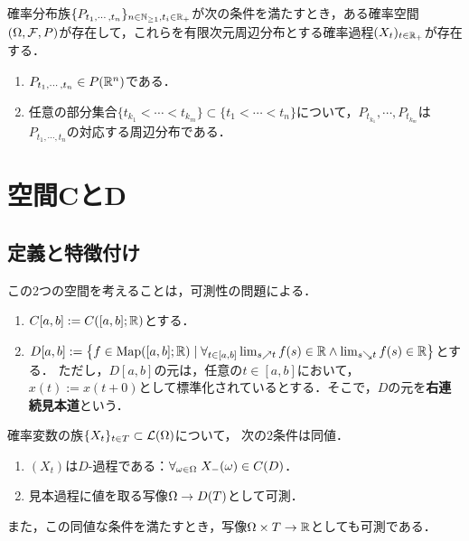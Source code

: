 \documentclass[uplatex,dvipdfmx]{jsreport}
\begin{document}
\begin{theorem}[確率過程版]\label{thm-Kolmogorov-extension-theorem}
    確率分布族$\{P_{t_1,\cdots,t_n}\}_{n\in\mathbb{N}_{\ge1},t_i\in\mathbb{R}_+}$が次の条件を満たすとき，ある確率空間$(\Omega,\mathcal{F},P)$が存在して，これらを有限次元周辺分布とする確率過程$(X_t)_{t\in\mathbb{R}_+}$が存在する．
    \begin{enumerate}[({C}1)]
        \item $P_{t_1,\cdots,t_n}\in P(\mathbb{R}^n)$である．
        \item 任意の部分集合$\{t_{k_1}<\cdots<t_{k_m}\}\subset\{t_1<\cdots<t_n\}$について，$P_{t_{k_1}},\cdots,P_{t_{k_m}}$は$P_{t_1,\cdots,t_n}$の対応する周辺分布である．
    \end{enumerate}
\end{theorem}

\section{空間CとD}

\subsection{定義と特徴付け}

\begin{tcolorbox}[colframe=ForestGreen, colback=ForestGreen!10!white,breakable,colbacktitle=ForestGreen!40!white,coltitle=black,fonttitle=\bfseries\sffamily,
title=]
    この2つの空間を考えることは，可測性の問題による．
\end{tcolorbox}

\begin{definition}\mbox{}
    \begin{enumerate}
        \item $C[a,b]:=C([a,b];\mathbb{R})$とする．
        \item $D[a,b]:=\left\{f\in\mathrm{Map}([a,b];\mathbb{R})\mid\forall_{t\in[a,b]}\lim_{s\nearrow t}f(s)\in\mathbb{R}\land\lim_{s\searrow t}f(s)\in\mathbb{R}\right\}$とする．
        ただし，$D[a,b]$の元は，任意の$t\in[a,b]$において，$x(t):=x(t+0)$として標準化されているとする．そこで，$D$の元を\textbf{右連続見本道}という．
    \end{enumerate}
\end{definition}

\begin{theorem}
    確率変数の族$\{X_t\}_{t\in T}\subset\mathcal{L}(\Omega)$について，
    次の2条件は同値．
    \begin{enumerate}
        \item $(X_t)$は$D$-過程である：$\forall_{\omega\in\Omega}\;X_-(\omega)\in C(D)$．
        \item 見本過程に値を取る写像$\Omega\to D(T)$として可測．
    \end{enumerate}
    また，この同値な条件を満たすとき，写像$\Omega\times T\to\mathbb{R}$としても可測である．
\end{theorem}
\end{document}

